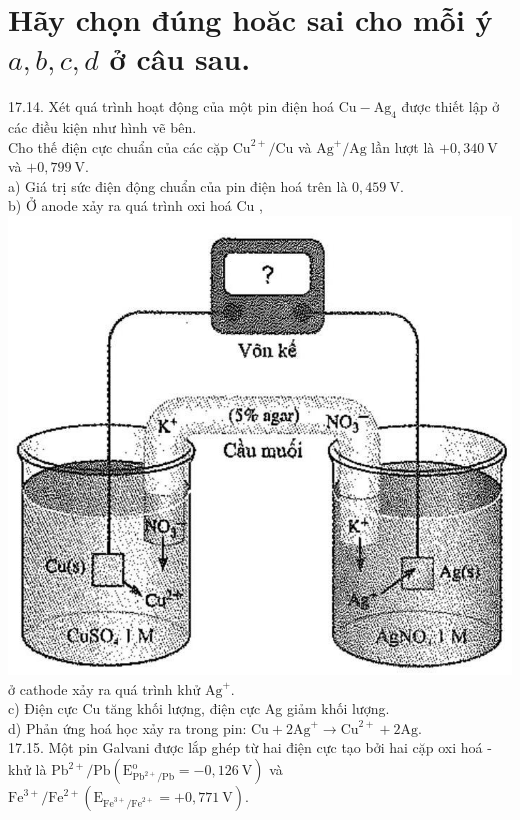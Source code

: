 \documentclass[10pt]{article}
\begin{document}
\section*{Hãy chọn đúng hoăc sai cho mỗi ý $a, b, c, d$ ở câu sau.}
17.14. Xét quá trình hoạt động của một pin điện hoá $\mathrm{Cu}-\mathrm{Ag}_{4}$ được thiết lập ở các điều kiện như hình vẽ bên.\\
Cho thế điện cực chuẩn của các cặp $\mathrm{Cu}^{2+} / \mathrm{Cu}$ và $\mathrm{Ag}^{+} / \mathrm{Ag}$ lần lượt là $+0,340 \mathrm{~V}$ và $+0,799 \mathrm{~V}$.\\
a) Giá trị sức điện động chuẩn của pin điện hoá trên là $0,459 \mathrm{~V}$.\\
b) Ở anode xảy ra quá trình oxi hoá Cu ,\\
\includegraphics[max width=\textwidth, center]{2025_10_23_74efce88ce3a451fd6b0g-058}\\
ở cathode xảy ra quá trình khử $\mathrm{Ag}^{+}$.\\
c) Điện cực Cu tăng khối lượng, điện cực Ag giảm khối lượng.\\
d) Phản ứng hoá học xảy ra trong pin: $\mathrm{Cu}+2 \mathrm{Ag}^{+} \longrightarrow \mathrm{Cu}^{2+}+2 \mathrm{Ag}$.\\
17.15. Một pin Galvani được lắp ghép từ hai điện cực tạo bởi hai cặp oxi hoá - khử là $\mathrm{Pb}^{2+} / \mathrm{Pb}\left(\mathrm{E}_{\mathrm{Pb}^{2+} / \mathrm{Pb}}^{\mathrm{o}}=-0,126 \mathrm{~V}\right)$ và $\mathrm{Fe}^{3+} / \mathrm{Fe}^{2+}\left(\mathrm{E}_{\mathrm{Fe}^{3+} / \mathrm{Fe}^{2+}}=+0,771 \mathrm{~V}\right)$.\\
\end{document}
